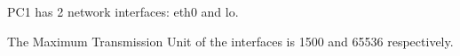 PC1 has 2 network interfaces: eth0 and lo. \newline

The Maximum Transmission Unit of the interfaces is 1500 and 65536 respectively.